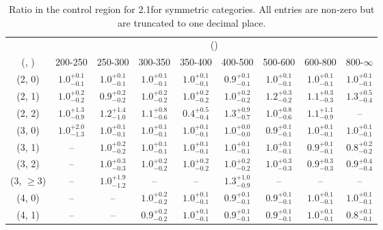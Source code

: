 \begin{table}[h!]
\tiny
\centering
\caption{Ratio in the \mj control region for 2.1\ifb for symmetric categories. All entries are non-zero but are truncated to one decimal place.\label{tab:ratiosepnaive_mu_ewk_sym}}
\begin{tabular}
{ccccccccc}
	\hline\hline
	& \multicolumn{8}{c}{\scalht (\gev)} \\ 
	 (\njet,  \nb) & 200-250 & 250-300 & 300-350 & 350-400 & 400-500 & 500-600 & 600-800 & 800-$\infty$ \\ [0.8ex] 
\hline
	(2, 0) & $1.0^{+ 0.1 }_{- 0.1 }$ & $1.0^{+ 0.1 }_{- 0.1 }$ & $1.0^{+ 0.1 }_{- 0.1 }$ & $1.0^{+ 0.1 }_{- 0.1 }$ & $0.9^{+ 0.1 }_{- 0.1 }$ & $1.0^{+ 0.1 }_{- 0.1 }$ & $1.0^{+ 0.1 }_{- 0.1 }$ & $1.0^{+ 0.1 }_{- 0.1 }$ \\[0.5ex] 
	(2, 1) & $1.0^{+ 0.2 }_{- 0.2 }$ & $0.9^{+ 0.2 }_{- 0.2 }$ & $1.0^{+ 0.2 }_{- 0.2 }$ & $1.0^{+ 0.2 }_{- 0.2 }$ & $1.0^{+ 0.2 }_{- 0.2 }$ & $1.2^{+ 0.3 }_{- 0.2 }$ & $1.1^{+ 0.3 }_{- 0.3 }$ & $1.3^{+ 0.5 }_{- 0.4 }$ \\[0.5ex] 
	(2, 2) & $1.0^{+ 1.3 }_{- 0.9 }$ & $1.2^{+ 1.4 }_{- 1.0 }$ & $1.1^{+ 0.8 }_{- 0.6 }$ & $0.4^{+ 0.5 }_{- 0.4 }$ & $1.3^{+ 0.9 }_{- 0.7 }$ & $1.0^{+ 0.8 }_{- 0.6 }$ & $1.1^{+ 1.1 }_{- 0.9 }$ & -- \\[0.5ex] 
	(3, 0) & $1.0^{+ 2.0 }_{- 1.3 }$ & $1.0^{+ 0.1 }_{- 0.1 }$ & $1.0^{+ 0.1 }_{- 0.1 }$ & $1.0^{+ 0.1 }_{- 0.1 }$ & $1.0^{+ 0.0 }_{- 0.0 }$ & $0.9^{+ 0.1 }_{- 0.1 }$ & $1.0^{+ 0.1 }_{- 0.1 }$ & $1.0^{+ 0.1 }_{- 0.1 }$ \\[0.5ex] 
	(3, 1) & -- & $1.0^{+ 0.2 }_{- 0.2 }$ & $1.0^{+ 0.1 }_{- 0.1 }$ & $1.0^{+ 0.1 }_{- 0.1 }$ & $1.0^{+ 0.1 }_{- 0.1 }$ & $1.0^{+ 0.1 }_{- 0.1 }$ & $0.9^{+ 0.1 }_{- 0.1 }$ & $0.8^{+ 0.2 }_{- 0.2 }$ \\[0.5ex] 
	(3, 2) & -- & $1.0^{+ 0.3 }_{- 0.3 }$ & $1.0^{+ 0.2 }_{- 0.2 }$ & $1.0^{+ 0.2 }_{- 0.2 }$ & $1.0^{+ 0.2 }_{- 0.2 }$ & $1.0^{+ 0.3 }_{- 0.3 }$ & $0.9^{+ 0.3 }_{- 0.3 }$ & $0.9^{+ 0.4 }_{- 0.4 }$ \\[0.5ex] 
	(3, $\ge3$) & -- & $1.0^{+ 1.9 }_{- 1.2 }$ & -- & -- & $1.3^{+ 1.0 }_{- 0.9 }$ & -- & -- & -- \\[0.5ex] 
	(4, 0) & -- & -- & $1.0^{+ 0.2 }_{- 0.2 }$ & $1.0^{+ 0.1 }_{- 0.1 }$ & $0.9^{+ 0.1 }_{- 0.1 }$ & $0.9^{+ 0.1 }_{- 0.1 }$ & $1.0^{+ 0.1 }_{- 0.1 }$ & $1.0^{+ 0.1 }_{- 0.1 }$ \\[0.5ex] 
	(4, 1) & -- & -- & $0.9^{+ 0.2 }_{- 0.2 }$ & $1.0^{+ 0.1 }_{- 0.1 }$ & $0.9^{+ 0.1 }_{- 0.1 }$ & $0.9^{+ 0.1 }_{- 0.1 }$ & $1.0^{+ 0.1 }_{- 0.1 }$ & $0.8^{+ 0.1 }_{- 0.1 }$ \\[0.5ex] 

\end{tabular}
\end{table}
